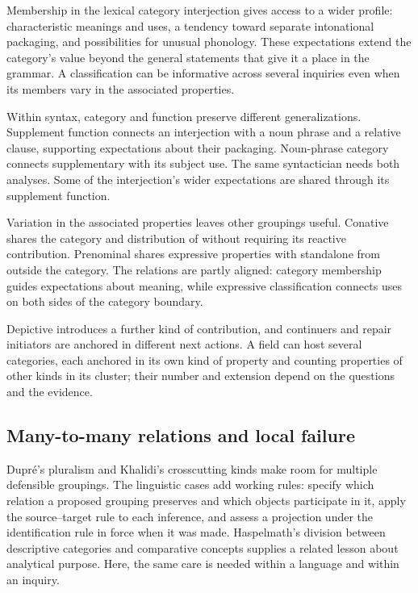 \documentclass[12pt]{article}
\begin{document}
Membership in the lexical category interjection gives access to a wider
profile: characteristic meanings and uses, a tendency toward separate
intonational packaging, and possibilities for unusual phonology. These
expectations extend the category's value beyond the general statements
that give it a place in the grammar. A classification can be informative across several inquiries
even when its members vary in the associated properties.

Within syntax, category and function preserve different generalizations.
Supplement function connects an interjection with a noun phrase and
a relative clause, supporting expectations about their packaging. Noun-phrase
category connects supplementary  with its subject
use. The same syntactician needs both analyses. Some of the interjection's
wider expectations are shared through its supplement function.

Variation in the associated properties leaves other groupings useful.
Conative  shares the category and distribution of 
without requiring its reactive contribution. Prenominal 
shares expressive properties with standalone  from outside
the category. The relations are partly aligned: category membership guides
expectations about meaning, while expressive classification connects uses
on both sides of the category boundary.

Depictive  introduces a further kind of contribution, and
continuers and repair initiators are anchored in different next actions.
A field can host several categories, each anchored in its own kind of
property and counting properties of other kinds in its cluster; their
number and extension depend on the questions and the evidence.

\subsection{Many-to-many relations and local failure}

Dupr\'e's pluralism and Khalidi's crosscutting kinds make room for
multiple defensible groupings. The linguistic cases add working rules:
specify which relation a proposed grouping preserves and which objects
participate in it, apply the source--target rule to each inference, and
assess a projection under the identification rule in force when it was
made. Haspelmath's division between descriptive
categories and comparative concepts supplies a related lesson about
analytical purpose. Here, the same care is needed within a language
and within an inquiry.
\end{document}
